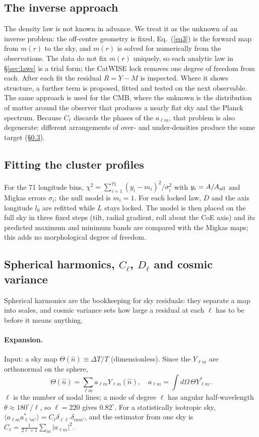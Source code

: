 \documentclass[10pt,twocolumn]{article}
\begin{document}
\subsection{The inverse approach}
The density law is not known in advance. We treat it as the unknown of an inverse problem: the off-centre geometry is fixed, Eq.~(\ref{eq3}) is the forward map from $m(r)$ to the sky, and $m(r)$ is solved for numerically from the observations. The data do not fix $m(r)$ uniquely, so each analytic law in \S\ref{sec:laws} is a trial form; the CatWISE lock removes one degree of freedom from each. After each fit the residual $R=Y-M$ is inspected. Where it shows structure, a further term is proposed, fitted and tested on the next observable. The same approach is used for the CMB, where the unknown is the distribution of matter around the observer that produces a nearly flat sky and the Planck spectrum. Because $C_\ell$ discards the phases of the $a_{\ell m}$, that problem is also degenerate: different arrangements of over- and under-densities produce the same target (\S\ref{sec:harm}).

\subsection{Fitting the cluster profiles}
For the 71 longitude bins, $\chi^2=\sum_{i=1}^{71}(y_i-m_i)^2/\sigma_i^2$ with $y_i=A/A_{\rm all}$ and Migkas errors $\sigma_i$; the null model is $m_i=1$. For each locked law, $D$ and the axis longitude $l_0$ are refitted while $L$ stays locked. The model is then placed on the full sky in three fixed steps (tilt, radial gradient, roll about the CoE axis) and its predicted maximum and minimum bands are compared with the Migkas maps; this adds no morphological degree of freedom.

\subsection{Spherical harmonics, $C_\ell$, $D_\ell$ and cosmic variance}\label{sec:harm}
Spherical harmonics are the bookkeeping for sky residuals: they separate a map into scales, and cosmic variance sets how large a residual at each $\ell$ has to be before it means anything.

\paragraph{Expansion.} Input: a sky map $\Theta(\hat n)\equiv\Delta T/T$ (dimensionless). Since the $Y_{\ell m}$ are orthonormal on the sphere,
\begin{equation}\label{eq6}
\Theta(\hat n)=\sum_{\ell m}a_{\ell m}Y_{\ell m}(\hat n),\quad a_{\ell m}=\!\int\!d\Omega\,\Theta Y^*_{\ell m}.
\end{equation}
$\ell$ is the number of nodal lines; a mode of degree $\ell$ has angular half-wavelength $\theta\approx180^\circ/\ell$, so $\ell=220$ gives $0.82^\circ$. For a statistically isotropic sky, $\langle a_{\ell m}a^*_{\ell'm'}\rangle=C_\ell\delta_{\ell\ell'}\delta_{mm'}$, and the estimator from one sky is $\hat C_\ell=\frac{1}{2\ell+1}\sum_m|a_{\ell m}|^2$.
\end{document}
